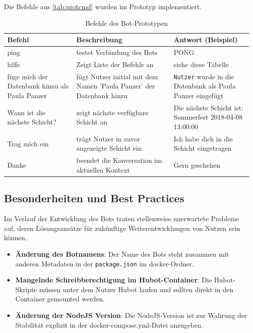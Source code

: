 Die Befehle aus \autoref{tab:protcmd} wurden im Prototyp implementiert.

\begin{table}[h!]
    \centering
    \begin{tabularx}{\textwidth}{|X|X|X|}
        \hline
        \textbf{Befehl} & \textbf{Beschreibung} & \textbf{Antwort} (Beispiel) \\
        \hline
        ping & testet Verbindung des Bots & PONG \\
        \hline
        hilfe & Zeigt Liste der Befehle an & siehe diese Tabelle \\
        \hline
        füge mich der Datenbank hinzu als Paula Panzer & fügt Nutzer initial mit dem Namen 'Paula Panzer' der Datenbank hinzu & \texttt{Nutzer} wurde in die Datenbank als Paula Panzer eingefügt \\
        \hline
        Wann ist die nächste Schicht? & zeigt nächste verfügbare Schicht an & Die nächste Schicht ist: Sommerfest 2018-04-08 13:00:00 \\
        \hline
        Trag mich ein & trägt Nutzer in zuvor angezeigte Schicht ein & Ich habe dich in die Schicht eingetragen \\
        \hline
        Danke & beendet die Konversation im aktuellen Kontext & Gern geschehen \\
        \hline
    \end{tabularx}
    \caption{Befehle des Bot-Prototypen}
    \label{tab:protcmd}
\end{table}


\subsection{Besonderheiten und Best Practices}

Im Verlauf der Entwicklung des Bots traten stellenweise unerwartete Probleme auf, deren Lösungsansätze für zukünftige Weiterentwicklungen von Nutzen sein können.
\begin{itemize}
    \item \textbf{Änderung des Botnamens}: Der Name des Bots steht zusammen mit anderen Metadaten in der \texttt{package.json} im docker-Ordner.
    \item \textbf{Mangelnde Schreibberechtigung im Hubot-Container}: Die Hubot-Skripte müssen unter dem Nutzer Hubot laufen und sollten direkt in den Container gemounted werden.
    \item \textbf{Änderung der NodeJS Version}: Die NodeJS-Version ist zur Wahrung der Stabilität explizit in der docker-compose.yml-Datei anzugeben.

\end{itemize}
